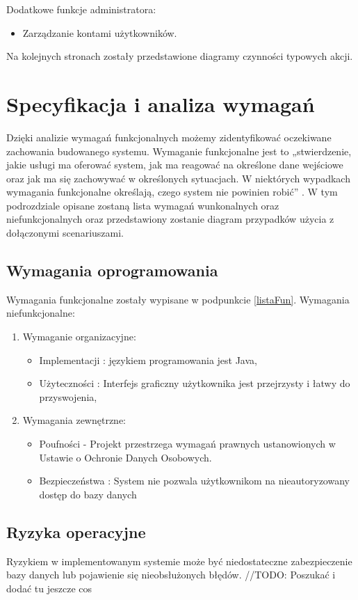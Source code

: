 Dodatkowe funkcje administratora:
\begin{itemize}
	\item Zarządzanie kontami użytkowników.
\end{itemize}

Na kolejnych stronach zostały przedstawione diagramy czynności typowych akcji.

	
\section{Specyfikacja i analiza wymagań}
Dzięki analizie wymagań funkcjonalnych możemy zidentyfikować oczekiwane zachowania budowanego systemu. Wymaganie funkcjonalne jest to „stwierdzenie, jakie usługi ma oferować system, jak ma reagować na określone dane wejściowe oraz jak ma się zachowywać w określonych sytuacjach. W niektórych wypadkach wymagania funkcjonalne określają, czego system nie powinien robić” \cite{DOC02}. W tym podrozdziale opisane zostaną lista wymagań wunkonalnych oraz niefunkcjonalnych oraz przedstawiony zostanie diagram przypadków użycia z dołączonymi scenariuszami.
\subsection{Wymagania oprogramowania}
Wymagania funkcjonalne zostały wypisane w podpunkcie \ref{listaFun}.
Wymagania niefunkcjonalne:
\begin{enumerate}
	\item Wymaganie organizacyjne:
		\begin{itemize}
			\item Implementacji : językiem programowania jest Java,
			\item Użyteczności : Interfejs graficzny użytkownika jest przejrzysty i łatwy do przyswojenia,
		\end{itemize}
	\item Wymagania zewnętrzne:		
		\begin{itemize}
			\item Poufności - Projekt przestrzega wymagań prawnych ustanowionych w Ustawie o Ochronie Danych Osobowych.
			\item Bezpieczeństwa : System nie pozwala użytkownikom na nieautoryzowany dostęp do bazy danych
		\end{itemize}
\end{enumerate}
\subsection{Ryzyka operacyjne}
Ryzykiem w implementowanym systemie może być niedostateczne zabezpieczenie bazy danych lub pojawienie się nieobsłużonych błędów.
//TODO: Poszukać i dodać tu jeszcze cos
